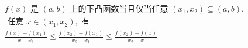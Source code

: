 \documentclass[preview]{standalone}
\begin{document}
\begin{align*}
& f(x) \text{ 是 } (a, b) \text{ 上的下凸函数当且仅当任意 } (x_1, x_2) \subseteq (a, b),\\ & \text{ 任意 } x \in (x_1, x_2), \text{ 有} \\ & \frac{f(x) - f(x_1)}{x - x_1} \leqslant \frac{f(x_2) - f(x_1)}{x_2 - x_1} \leqslant \frac{f(x_2) - f(x)}{x_2 - x}
\end{align*}
\end{document}

